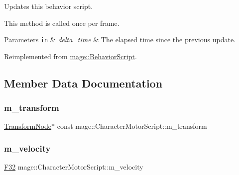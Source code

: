 Updates this behavior script.

This method is called once per frame.


\begin{DoxyParams}[1]{Parameters}
\mbox{\tt in}  & {\em delta\+\_\+time} & The elapsed time since the previous update. \\
\hline
\end{DoxyParams}


Reimplemented from \hyperlink{classmage_1_1_behavior_script_afb9cf3759edf8876416d1df85489cba6}{mage\+::\+Behavior\+Script}.



\subsection{Member Data Documentation}
\hypertarget{classmage_1_1_character_motor_script_ab73049127363ded0e6e8fb474b51794e}{}\label{classmage_1_1_character_motor_script_ab73049127363ded0e6e8fb474b51794e} 
\subsubsection{\texorpdfstring{m\+\_\+transform}{m\_transform}}
{\footnotesize\ttfamily \hyperlink{classmage_1_1_transform_node}{Transform\+Node}$\ast$ const mage\+::\+Character\+Motor\+Script\+::m\+\_\+transform\hspace{0.3cm}{\ttfamily [private]}}

\hypertarget{classmage_1_1_character_motor_script_ab5a6c95ef8d0d7d914c2f7c447137f04}{}\label{classmage_1_1_character_motor_script_ab5a6c95ef8d0d7d914c2f7c447137f04} 
\subsubsection{\texorpdfstring{m\+\_\+velocity}{m\_velocity}}
{\footnotesize\ttfamily \hyperlink{namespacemage_aa97e833b45f06d60a0a9c4fc22ae02c0}{F32} mage\+::\+Character\+Motor\+Script\+::m\+\_\+velocity\hspace{0.3cm}{\ttfamily [private]}}

